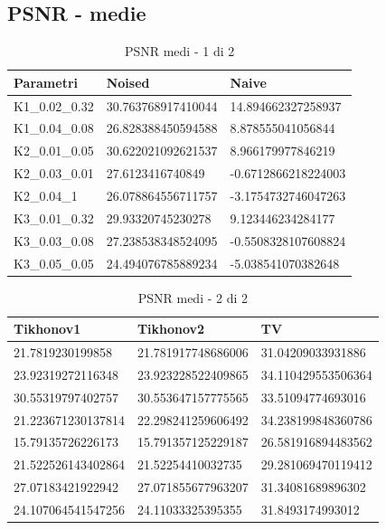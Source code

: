 \documentclass[12pt]{article}
\begin{document}
    \subsection{PSNR - medie}
    
    \begin{table}[!ht]
    \centering
    \begin{tabular}{|l|l|l|}
    \hline
        Parametri & Noised & Naive \\ \hline
        K1\_0.02\_0.32 & 30.763768917410044 & 14.894662327258937 \\ \hline
        K1\_0.04\_0.08 & 26.828388450594588 & 8.878555041056844 \\ \hline
        K2\_0.01\_0.05 & 30.622021092621537 & 8.966179977846219 \\ \hline
        K2\_0.03\_0.01 & 27.6123416740849 & -0.6712866218224003 \\ \hline
        K2\_0.04\_1 & 26.078864556711757 & -3.1754732746047263 \\ \hline
        K3\_0.01\_0.32 & 29.93320745230278 & 9.123446234284177 \\ \hline
        K3\_0.03\_0.08 & 27.238538348524095 & -0.5508328107608824 \\ \hline
        K3\_0.05\_0.05 & 24.494076785889234 & -5.038541070382648 \\ \hline
    \end{tabular}
    \caption{PSNR medi - 1 di 2}
    \label{table:6}
    \end{table}
    
    \begin{table}[!ht]
    \centering
    \begin{tabular}{|l|l|l|}
    \hline
        Tikhonov1 & Tikhonov2 & TV \\ \hline
        21.7819230199858 & 21.781917748686006 & 31.04209033931886 \\ \hline
        23.92319272116348 & 23.923228522409865 & 34.110429553506364 \\ \hline
        30.55319797402757 & 30.553647157775565 & 33.51094774693016 \\ \hline
        21.223671230137814 & 22.298241259606492 & 34.238199848360786 \\ \hline
        15.79135726226173 & 15.791357125229187 & 26.581916894483562 \\ \hline
        21.522526143402864 & 21.52254410032735 & 29.281069470119412 \\ \hline
        27.07183421922942 & 27.071855677963207 & 31.34081689896302 \\ \hline
        24.107064541547256 & 24.11033325395355 & 31.8493174993012 \\ \hline
    \end{tabular}
    \caption{PSNR medi - 2 di 2}
    \label{table:7}
    \end{table}
    
\end{document}

